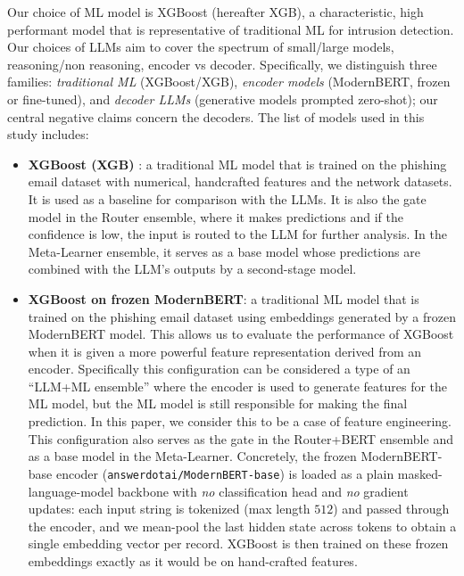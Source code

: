 \documentclass{jmlr}
\begin{document}
Our choice of ML model is XGBoost \citep{chen2016xgboost} (hereafter XGB), a characteristic, high performant model that is representative of traditional ML for intrusion detection. Our choices of LLMs aim to cover the spectrum of small/large models, reasoning/non reasoning, encoder vs decoder. Specifically, we distinguish three families: \emph{traditional ML} (XGBoost/XGB), \emph{encoder models} (ModernBERT, frozen or fine-tuned), and \emph{decoder LLMs} (generative models prompted zero-shot); our central negative claims concern the decoders. The list of models used in this study includes:
\begin{itemize}
\item \textbf{XGBoost (XGB)} \citep{chen2016xgboost}: a traditional ML model that is trained on the phishing email dataset with numerical, handcrafted features and the network datasets. It is used as a baseline for comparison with the LLMs. It is also the gate model in the Router ensemble, where it makes predictions and if the confidence is low, the input is routed to the LLM for further analysis. In the Meta-Learner ensemble, it serves as a base model whose predictions are combined with the LLM's outputs by a second-stage model.
\item \textbf{XGBoost on frozen ModernBERT}: a traditional ML model that is trained on the phishing email dataset using embeddings generated by a frozen ModernBERT model. This allows us to evaluate the performance of XGBoost when it is given a more powerful feature representation derived from an encoder. Specifically this configuration can be considered a type of an ``LLM+ML ensemble'' where the encoder is used to generate features for the ML model, but the ML model is still responsible for making the final prediction. In this paper, we consider this to be a case of feature engineering. This configuration also serves as the gate in the Router+BERT ensemble and as a base model in the Meta-Learner. Concretely, the frozen ModernBERT-base encoder (\texttt{answerdotai/ModernBERT-base}) is loaded as a plain masked-language-model backbone with \emph{no} classification head and \emph{no} gradient updates: each input string is tokenized (max length $512$) and passed through the encoder, and we mean-pool the last hidden state across tokens to obtain a single embedding vector per record. XGBoost is then trained on these frozen embeddings exactly as it would be on hand-crafted features.

\end{itemize}
\end{document}
